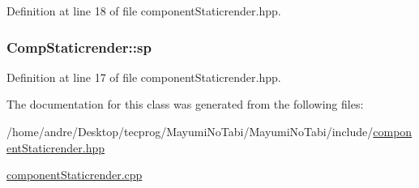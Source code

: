 Definition at line 18 of file component\-Static\-render.\-hpp.

\hypertarget{class_comp_static_render_a0b0396c860cd01d3572b68558e775ef6}{
\subsubsection[{sp}]{ Comp\-Static\-render\-::sp}}\label{class_comp_static_render_a0b0396c860cd01d3572b68558e775ef6}


Definition at line 17 of file component\-Static\-render.\-hpp.



The documentation for this class was generated from the following files\-:\begin{DoxyCompactItemize}
\item 
/home/andre/\-Desktop/tecprog/\-Mayumi\-No\-Tabi/\-Mayumi\-No\-Tabi/include/\hyperlink{component_static_render_8hpp}{component\-Static\-render.\-hpp}\item 
\hyperlink{component_static_render_8cpp}{component\-Static\-render.\-cpp}\end{DoxyCompactItemize}
